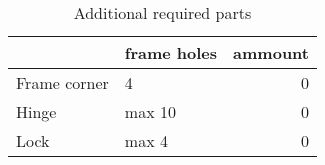 \begin{table}[h!]
\centering
\caption{Additional required parts}
\begin{tabular}{llr}
\toprule
{} & frame holes &  ammount \\
\midrule
Frame corner &           4 &        0 \\
Hinge        &      max 10 &        0 \\
Lock         &       max 4 &        0 \\
\bottomrule
\end{tabular}
\end{table}
